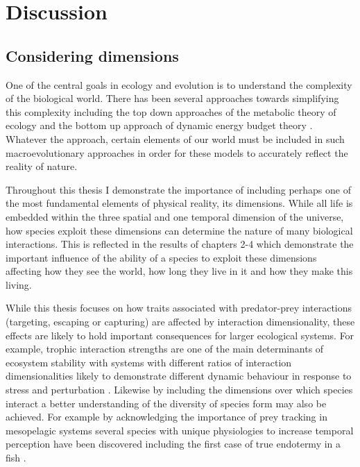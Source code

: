 \chapter{Discussion}
\label{chap:discussion}


\section{Considering dimensions}

One of the central goals in ecology and evolution is to understand the complexity of the biological world. There has been several approaches towards simplifying this complexity including the top down approaches of the metabolic theory of ecology \citep{brown2004} and the bottom up approach of dynamic energy budget theory \citep{kooijman2009dynamic}. Whatever the approach, certain elements of our world must be included in such macroevolutionary approaches in order for these models to accurately reflect the reality of nature. 


Throughout this thesis I demonstrate the importance of including perhaps one of the most fundamental elements of physical reality, its dimensions. While all life is embedded within the three spatial and one temporal dimension of the universe, how species exploit these dimensions can determine the nature of many biological interactions. This is reflected in the results of chapters 2-4 which demonstrate the important influence of the ability of a species to exploit these dimensions affecting how they see the world, how long they live in it and how they make this living. 


While this thesis focuses on how traits associated with predator-prey interactions (targeting, escaping or capturing) are affected by interaction dimensionality, these effects are likely to hold important consequences for larger ecological systems. For example, trophic interaction strengths are one of the main determinants of ecosystem stability \citep{may1972will,pimm1984complexity} with systems with different ratios of interaction dimensionalities likely to demonstrate different dynamic behaviour in response to stress and perturbation \citep{donohue2013dimensionality}. Likewise by including the dimensions over which species interact a better understanding of the diversity of species form may also be achieved. For example by acknowledging the importance of prey tracking in mesopelagic systems several species with unique physiologies to increase temporal perception have been discovered \citep{fritsches2005warm,frank2012light,landgren2014visual} including the first case of true endotermy in a fish \citep{Wegner15052015}.


